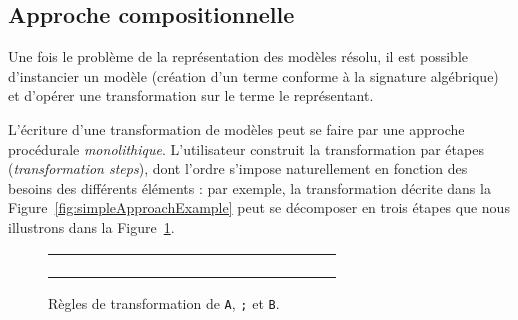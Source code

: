 \subsection{Approche compositionnelle}%
\label{approach:subsec:composition}


Une fois le problème de la représentation des modèles résolu, il est possible
d'instancier un modèle (création d'un terme conforme à la signature algébrique)
et d'opérer une transformation sur le terme le représentant.

L'écriture d'une transformation de modèles peut se faire par une approche
procédurale \emph{monolithique}. L'utilisateur construit la transformation par
étapes (\emph{transformation steps}), dont l'ordre s'impose naturellement
en fonction des besoins des différents éléments : par exemple, la
transformation décrite dans la Figure~\ref{fig:simpleApproachExample} peut se
décomposer en trois étapes que nous illustrons dans la
Figure~\ref{fig:approachSimpleRules}.

\begin{figure}[h]
  \centering
\begin{tabular}{c|c|c}
  \begin{subfigure}{0.30\textwidth}
    \centering
    
    \subcaption{}
  \end{subfigure}
  &
  \begin{subfigure}{0.30\textwidth}
    \centering
    
    \subcaption{}
  \end{subfigure}
  &
  \begin{subfigure}{0.30\textwidth}
    \centering
    
    \subcaption{}
  \end{subfigure}
\end{tabular}
  \caption{Règles de transformation de \texttt{A}, \texttt{;} et \texttt{B}.}
  \label{fig:approachSimpleRules}
\end{figure}

